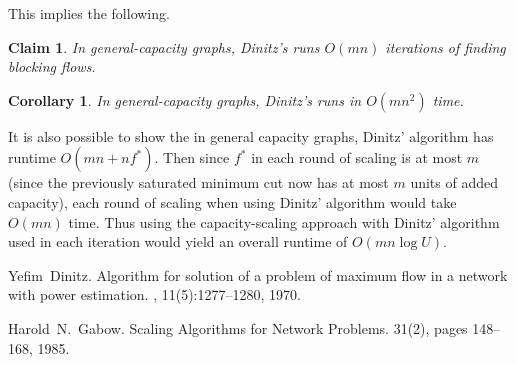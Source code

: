 \documentclass[11pt]{article}
\newtheorem*{corollary}{Corollary}
\newtheorem*{claim}{Claim}
\begin{document}
This implies the following.

\begin{claim}
In general-capacity graphs, Dinitz's runs $O(mn)$ iterations of finding blocking flows.
\end{claim}
\begin{corollary}
In general-capacity graphs, Dinitz's runs in $O(mn^2)$ time.
\end{corollary}

It is also possible to show the in general capacity graphs, Dinitz' algorithm has runtime $O(mn + nf^*)$. Then since $f^*$ in each round of scaling is at most $m$ (since the previously saturated minimum cut now has at most $m$ units of added capacity), each round of scaling when using Dinitz' algorithm would take $O(mn)$ time. Thus using the capacity-scaling approach with Dinitz' algorithm used in each iteration would yield an overall runtime of $O(mn\log U)$.




\begin{thebibliography}{42}

Yefim~Dinitz.
\newblock Algorithm for solution of a problem of maximum flow in a network with power estimation.
, 11(5):1277--1280, 1970.

Harold~N.~Gabow.
\newblock Scaling Algorithms for Network Problems.
 31(2), pages 148--168, 1985.

\end{thebibliography}
\end{document}
